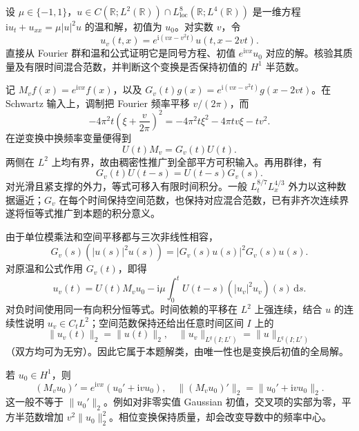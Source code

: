 \begin{exercise}\label{b2:ex:app-E-8}
设 \(\mu\in\{-1,1\}\)，\(u\in C(\mathbb R;L^2(\mathbb R))\cap L^8_{\mathrm{loc}}(\mathbb R;L^4(\mathbb R))\) 是一维方程 \(\mathrm i u_t+u_{xx}=\mu|u|^2u\) 的温和解，初值为 \(u_0\)。对实数 \(v\)，令
\[
 u_v(t,x)=e^{\mathrm i(vx-v^2t)}u(t,x-2vt).
\]
直接从 Fourier 群和温和公式证明它是同号方程、初值 \(e^{\mathrm ivx}u_0\) 对应的解。核验其质量及有限时间混合范数，并判断这个变换是否保持初值的 \(H^1\) 半范数。
\end{exercise}
\begin{solution}
记 \(M_vf(x)=e^{\mathrm ivx}f(x)\)，以及
\(G_v(t)g(x)=e^{\mathrm i(vx-v^2t)}g(x-2vt)\)。在 Schwartz 输入上，调制把 Fourier 频率平移 \(v/(2\pi)\)，而
\[
 -4\pi^2t\left(\xi+\frac v{2\pi}\right)^2
 =-4\pi^2t\xi^2-4\pi tv\xi-tv^2.
\]
在逆变换中换频率变量便得到
\[
 U(t)M_v=G_v(t)U(t).
\]
两侧在 \(L^2\) 上均有界，故由稠密性推广到全部平方可积输入。再用群律，有
\[
 G_v(t)U(t-s)=U(t-s)G_v(s).
\]
对光滑且紧支撑的外力，等式可移入有限时间积分。一般 \(L^{8/7}_tL^{4/3}_x\) 外力以这种数据逼近；\(G_v\) 在每个时间保持空间范数，也保持对应混合范数，已有非齐次连续界遂将恒等式推广到本题的积分意义。

由于单位模乘法和空间平移都与三次非线性相容，
\[
 G_v(s)(|u(s)|^2u(s))=|G_v(s)u(s)|^2G_v(s)u(s).
\]
对原温和公式作用 \(G_v(t)\)，即得
\[
 u_v(t)=U(t)M_vu_0-\mathrm i\mu
       \int_0^tU(t-s)(|u_v|^2u_v)(s)\,\mathrm ds.
\]
对负时间使用同一有向积分恒等式。时间依赖的平移在 \(L^2\) 上强连续，结合 \(u\) 的连续性说明 \(u_v\in C_tL^2\)；空间范数保持还给出任意时间区间 \(I\) 上的
\[
 \|u_v(t)\|_2=\|u(t)\|_2,\quad
 \|u_v\|_{L^q(I;L^r)}=\|u\|_{L^q(I;L^r)}
\]
（双方均可为无穷）。因此它属于本题解类，由唯一性也是变换后初值的全局解。

若 \(u_0\in H^1\)，则
\[
 (M_vu_0)'=e^{\mathrm ivx}(u_0'+\mathrm ivu_0),\quad
 \|(M_vu_0)'\|_2=\|u_0'+\mathrm ivu_0\|_2.
\]
这一般不等于 \(\|u_0'\|_2\)。例如对非零实值 Gaussian 初值，交叉项的实部为零，平方半范数增加 \(v^2\|u_0\|_2^2\)。相位变换保持质量，却会改变导数中的频率中心。
\end{solution}
